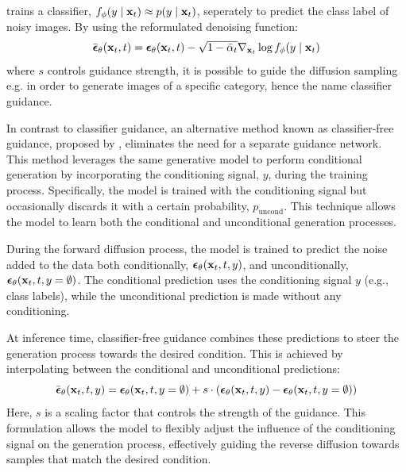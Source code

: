 \cite{dharial2021diffusion} trains a classifier, $f_\phi(y \mid \boldsymbol{\mathbf{x}}_t) \approx p(y \mid \boldsymbol{\mathbf{x}}_t)$, seperately to predict the class label of noisy images. By using the reformulated denoising function:
\begin{equation} \label{eq:classifier-guidance}
    \bar{\boldsymbol{\mathbf{\epsilon}}}_{\theta}(\boldsymbol{\mathbf{x}}_t, t) = \boldsymbol{\mathbf{\epsilon}}_\theta(\boldsymbol{\mathbf{x}}_t, t) - \sqrt{1 - \bar{\alpha}_t} \nabla_{\boldsymbol{\mathbf{x}}_t} \log f_\phi(y \mid \boldsymbol{\mathbf{x}}_t)
\end{equation}
where $s$ controls guidance strength, it is possible to guide the diffusion sampling e.g. in order to generate images of a specific category, hence the name classifier guidance. 

In contrast to classifier guidance, an alternative method known as classifier-free guidance, proposed by \cite{ho2021classifierfree}, eliminates the need for a separate guidance network. This method leverages the same generative model to perform conditional generation by incorporating the conditioning signal, $y$, during the training process. Specifically, the model is trained with the conditioning signal but occasionally discards it with a certain probability, $p_\text{uncond}$. This technique allows the model to learn both the conditional and unconditional generation processes.

During the forward diffusion process, the model is trained to predict the noise added to the data both conditionally, $\boldsymbol{\mathbf{\epsilon}}_\theta(\boldsymbol{\mathbf{x}}_t, t, y)$, and unconditionally, $\boldsymbol{\mathbf{\epsilon}}_\theta(\boldsymbol{\mathbf{x}}_t, t, y = \emptyset)$. The conditional prediction uses the conditioning signal $y$ (e.g., class labels), while the unconditional prediction is made without any conditioning.

At inference time, classifier-free guidance combines these predictions to steer the generation process towards the desired condition. This is achieved by interpolating between the conditional and unconditional predictions:
\begin{equation}
    \bar{\boldsymbol{\mathbf{\epsilon}}}_\theta(\boldsymbol{\mathbf{x}}_t, t, y) = \boldsymbol{\mathbf{\epsilon}}_\theta(\boldsymbol{\mathbf{x}}_t, t, y = \emptyset) + s \cdot (\boldsymbol{\mathbf{\epsilon}}_\theta(\boldsymbol{\mathbf{x}}_t, t, y) - \boldsymbol{\mathbf{\epsilon}}_\theta(\boldsymbol{\mathbf{x}}_t, t, y = \emptyset))
    \label{eq:classifer-free}
\end{equation}
Here, $s$ is a scaling factor that controls the strength of the guidance. This formulation allows the model to flexibly adjust the influence of the conditioning signal on the generation process, effectively guiding the reverse diffusion towards samples that match the desired condition.

